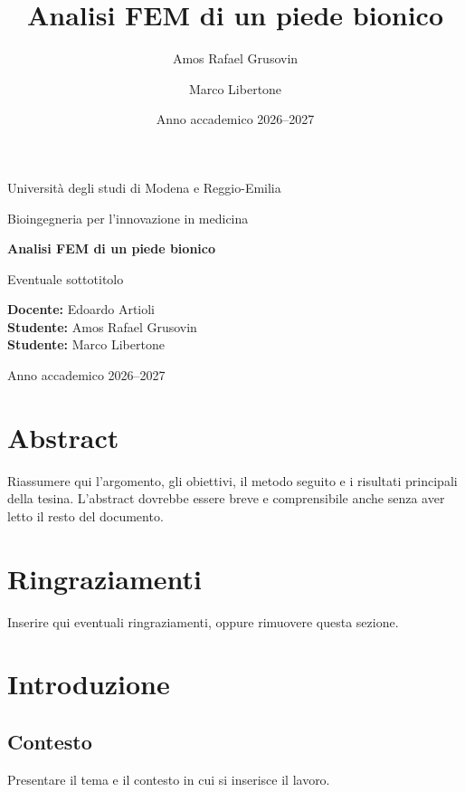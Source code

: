 \documentclass[12pt,a4paper,oneside]{report}
\title{Analisi FEM di un piede bionico}
\author{Amos Rafael Grusovin}
\author{Marco Libertone}
\date{Anno accademico 2026--2027}
\begin{document}
\begin{titlepage}
    \centering
    {\Large Università degli studi di Modena e Reggio-Emilia\par}
    \vspace{1.5cm}
    {\large Bioingegneria per l'innovazione in medicina\par}
    \vspace{2.5cm}
    {\Huge\bfseries Analisi FEM di un piede bionico\par}
    \vspace{0.5cm}
    {\Large Eventuale sottotitolo\par}
    \vfill
    \begin{flushleft}
        \textbf{Docente:} Edoardo Artioli\\[0.3cm]
        \textbf{Studente:} Amos Rafael Grusovin\\
        \textbf{Studente:} Marco Libertone
    \end{flushleft}
    \vfill
    {\large Anno accademico 2026--2027\par}
\end{titlepage}


\chapter*{Abstract}
Riassumere qui l'argomento, gli obiettivi, il metodo seguito e i risultati
principali della tesina. L'abstract dovrebbe essere breve e comprensibile
anche senza aver letto il resto del documento.

\chapter*{Ringraziamenti}
Inserire qui eventuali ringraziamenti, oppure rimuovere questa sezione.

\tableofcontents
\clearpage
\renewcommand{\thepage}{\arabic{page}}

\chapter{Introduzione}
\section{Contesto}
Presentare il tema e il contesto in cui si inserisce il lavoro.
\end{document}
